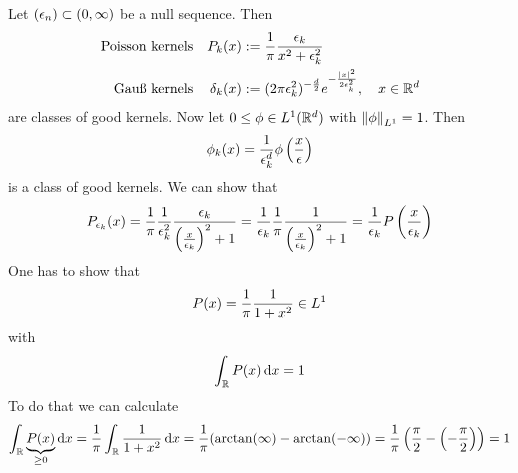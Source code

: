 \documentclass[../../script.tex]{subfiles}
\begin{document}
\begin{eg}
    Let $\anyseqdef[\epsilon]{(0, \infty)}$ be a null sequence. Then
    \begin{align*}
        \text{Poisson kernels}& & P_{k}(x) &:= \rec{\pi} \frac{\epsilon_k}{x^2 + \epsilon_k^2} \\
        \text{Gauß kernels}& & \delta_k(x) &:= (2\pi \epsilon_k^2)^{-\frac{d}{2}} e^{-\frac{\abs{x}^2}{2 \epsilon_k^2}}, \quad x \in \realn^d
    \end{align*}
    are classes of good kernels. Now let $0 \le \phi \in L^1(\realn^d)$ with $\norm{\phi}_{L^1} = 1$. Then 
    \[
        \phi_k(x) = \rec{\epsilon_k^d} \phi\left(\frac{x}{\epsilon}\right)
    \]
    is a class of good kernels. We can show that 
    \[
        P_{\epsilon_k} (x) = \rec{\pi} \rec{\epsilon_k^2} \frac{\epsilon_k}{\left(\frac{x}{\epsilon_k}\right)^2 + 1} = \rec{\epsilon_k} \rec{\pi} \rec{\left(\frac{x}{\epsilon_k}\right)^2 + 1} = \rec{\epsilon_k} P\left(\frac{x}{\epsilon_k}\right)
    \]
    One has to show that 
    \[
        P(x) = \rec{\pi} \rec{1 + x^2} \in L^1
    \]
    with 
    \[
        \int_{\realn} P(x) \dd{x} = 1
    \]
    To do that we can calculate
    \[
        \int_{\realn} \underbrace{P(x)}_{\ge 0} \dd{x} = \rec{\pi} \int_{\realn} \rec{1 + x^2} \dd{x} = \rec{\pi} (\arctan(\infty) - \arctan(-\infty)) = \rec{\pi} \left(\frac{\pi}{2} - \left(-\frac{\pi}{2}\right)\right) = 1
    \]
\end{eg}
\end{document}
